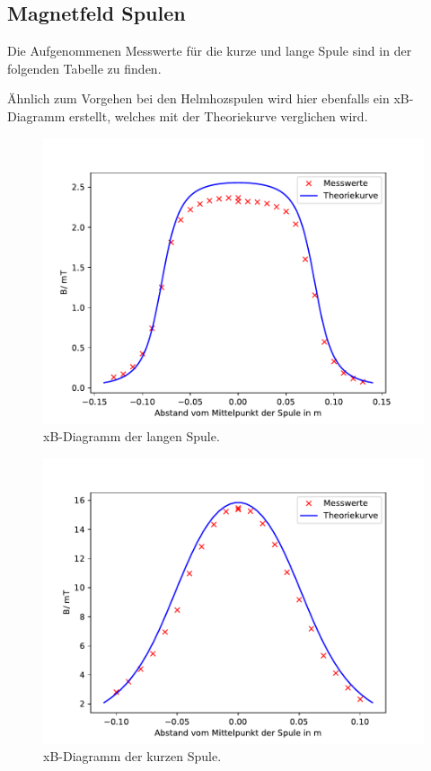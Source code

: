 \subsection{Magnetfeld Spulen}
Die Aufgenommenen Messwerte für die kurze und lange
Spule sind in der folgenden Tabelle zu finden.

Ähnlich zum Vorgehen bei den Helmhozspulen wird hier
ebenfalls ein xB-Diagramm erstellt, welches mit
der Theoriekurve verglichen wird.

\begin{figure}[H]
  \centering
  \includegraphics{LangeSpule.pdf}
  \caption{xB-Diagramm der langen Spule.}
  \label{fig:LangeSpule}
\end{figure}
\begin{figure}[H]
  \includegraphics{KurzeSpule.pdf}
  \caption{xB-Diagramm der kurzen Spule.}
  \label{fig:KurzeSpule}
\end{figure}




\label{sec:Auswertung}

